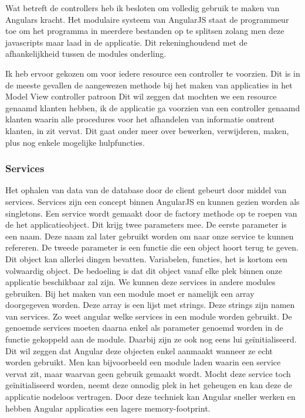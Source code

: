 \documentclass[a4paper,11pt]{article}
\begin{document}
Wat betreft de controllers heb ik besloten om volledig gebruik te maken van Angulars kracht. Het modulaire systeem van AngularJS staat de programmeur toe om het programma in meerdere bestanden op te splitsen zolang men deze javascripts maar laad in de applicatie. Dit rekeninghoudend met de afhankelijkheid tussen de modules onderling.

Ik heb ervoor gekozen om voor iedere resource een controller te voorzien. Dit is in de meeste gevallen de aangewezen methode bij het maken van applicaties in het Model View controller patroon %
Dit wil zeggen dat mochten we een resource genaamd klanten hebben, ik de applicatie ga voorzien van een controller genaamd klanten waarin alle procedures voor het afhandelen van informatie omtrent klanten, in zit vervat.  Dit gaat onder meer over bewerken, verwijderen, maken, plus nog enkele mogelijke hulpfuncties.

\subsubsection{Services}
Het ophalen van data van de database door de client gebeurt door middel van services. Services zijn een concept binnen AngularJS en kunnen gezien worden als singletons. Een service wordt gemaakt door de factory methode op te roepen van de het applicatieobject. Dit krijg twee parameters mee. De eerste parameter is een naam. Deze naam zal later gebruikt worden om naar onze service te kunnen refereren. De tweede parameter is een functie die een object hoort terug te geven. Dit object kan allerlei dingen bevatten. Variabelen, functies, het is kortom een volwaardig object. De bedoeling is dat dit object vanaf elke plek binnen onze applicatie beschikbaar zal zijn. We kunnen deze services in andere modules gebruiken. Bij het maken van een module moet er namelijk een array doorgegeven worden. Deze array is een lijst met strings. Deze strings zijn namen van services. Zo weet angular welke services in een module worden gebruikt. De genoemde services moeten daarna enkel als parameter genoemd worden in de functie gekoppeld aan de module. Daarbij zijn ze ook nog eens lui geïnitialiseerd. Dit wil zeggen dat Angular deze objecten enkel aanmaakt wanneer ze echt worden gebruikt. Men kan bijvoorbeeld een module laden waarin een service vervat zit, maar waarvan geen gebruik gemaakt wordt. Mocht deze service toch geïnitialiseerd worden, neemt deze onnodig plek in het geheugen en kan deze de applicatie nodeloos vertragen. Door deze techniek kan Angular sneller werken en hebben Angular applicaties een lagere memory-footprint.
\end{document}

